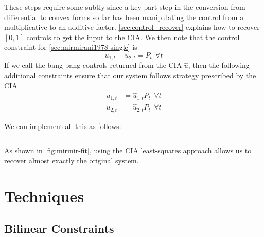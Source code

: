 \documentclass{article}
\begin{document}
These steps require some subtly since a key part step in the conversion from differential to convex forms so far has been manipulating the control from a multiplicative to an additive factor. \autoref{sec:control_recover} explains how to recover $[0,1]$ controls to get the input to the CIA. We then note that the control constraint for \autoref{sec:mirmirani1978-single} is
\begin{equation}
u_{1,t}+u_{2,t}=P_t~~\forall t
\end{equation}
If we call the bang-bang controls returned from the CIA $\hat u$, then the following additional constraints ensure that our system follows strategy prescribed by the CIA
\begin{equation}
\begin{aligned}
u_{1,t}&=\hat u_{1,t} P_t~~\forall t \\
u_{2,t}&=\hat u_{2,t} P_t~~\forall t
\end{aligned}
\end{equation}

We can implement all this as follows:

\inputminted[firstline=40,lastline=61,frame=single,linenos]{python}{src/MirmiraniOster1978_inverse_problem.py}

As shown in \autoref{fig:mirmir-fit}, using the CIA least-squares approach allows us to recover almost exactly the original system.





\section{Techniques}
\label{sec:techniques}




\subsection{Bilinear Constraints}
\end{document}
